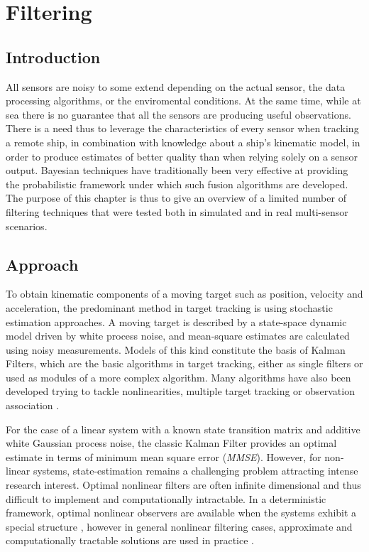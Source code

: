 \chapter{Filtering}
\section{Introduction}
All sensors are noisy to some extend depending on the actual sensor, the data processing algorithms, or the enviromental conditions. At the same time, while at sea there is no guarantee that all the sensors are producing useful observations. There is a need thus to leverage the characteristics of every sensor when tracking a remote ship, in combination with knowledge about a ship's kinematic model, in order to produce estimates of better quality than when relying solely on a sensor output. Bayesian techniques have traditionally been very effective at providing the probabilistic framework under which such fusion algorithms are developed. The purpose of this chapter is thus to give an overview of a limited number of filtering techniques that were tested both in simulated and in real multi-sensor scenarios.

\section{Approach}
To obtain kinematic components of a moving target such as position, velocity and acceleration, the predominant method in target tracking is using stochastic estimation approaches. A moving target is described by a state-space dynamic model driven by white process noise, and mean-square estimates are calculated using noisy measurements. Models of this kind constitute the basis of Kalman Filters, which are the basic algorithms in target tracking, either as single filters or used as modules of a more complex algorithm. Many algorithms have also been developed trying to tackle nonlinearities, multiple target tracking or observation association \cite{Ekstrand2012}.

For the case of a linear system with a known state transition matrix and additive white Gaussian process noise, the classic Kalman Filter provides an optimal estimate in terms of minimum mean square error (\emph{MMSE}). However, for non-linear systems, state-estimation remains a challenging problem attracting intense research interest. Optimal nonlinear filters are often infinite dimensional and thus difficult to implement and computationally intractable. In a deterministic framework, optimal nonlinear observers are available when the systems exhibit a special structure \cite{Krener1985} , however in general nonlinear filtering cases, approximate and computationally tractable solutions are used in practice \cite{Daum2005}.

